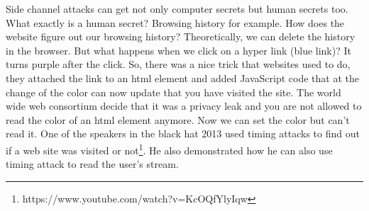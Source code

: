 Side channel attacks can get not only computer secrets but human secrets too. What exactly is a human secret? Browsing history for example. How does the website figure out our browsing history? Theoretically, we can delete the history in the browser. But what happens when we click on a hyper link (blue link)? It turns purple after the click. So, there was a nice trick that websites used to do, they attached the link to an html element and added JavaScript code that at the change of the color can now update that you have visited the site. The world wide web consortium decide that it was a privacy leak and you are not allowed to read the color of an html element anymore. Now we can set the color but can’t read it. One of the speakers in the black hat 2013 used timing attacks to find out if a web site was visited or not\footnote{https://www.youtube.com/watch?v=KcOQfYlyIqw}. He also demonstrated how he can also use timing attack to read the user’s stream. 